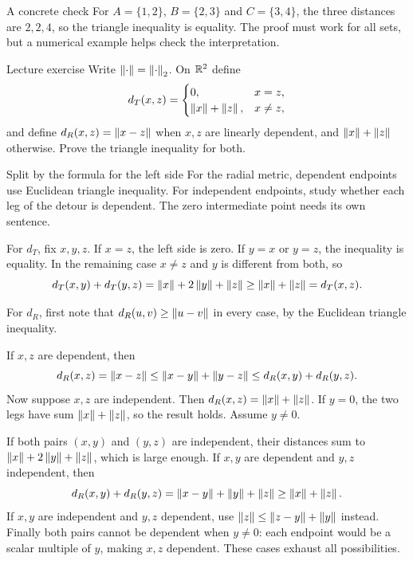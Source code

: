 \begin{note}{A concrete check}
For $A=\{1,2\}$, $B=\{2,3\}$ and $C=\{3,4\}$, the three distances are $2,2,4$, so the triangle inequality is equality. The proof must work for all sets, but a numerical example helps check the interpretation.
\end{note}
\begin{exam}{Lecture exercise}
Write $\left\lVert\cdot\right\rVert=\left\lVert\cdot\right\rVert_2$. On $\mathbb R^2$ define
\[d_T(x,z)=\begin{cases}0,&x=z,\\\left\lVert x\right\rVert+\left\lVert z\right\rVert,&x\ne z,\end{cases}\]
and define $d_R(x,z)=\left\lVert x-z\right\rVert$ when $x,z$ are linearly dependent, and $\left\lVert x\right\rVert+\left\lVert z\right\rVert$ otherwise. Prove the triangle inequality for both.
\end{exam}
\begin{method}{Split by the formula for the left side}
For the radial metric, dependent endpoints use Euclidean triangle inequality. For independent endpoints, study whether each leg of the detour is dependent. The zero intermediate point needs its own sentence.
\end{method}
\begin{answer}
For $d_T$, fix $x,y,z$. If $x=z$, the left side is zero. If $y=x$ or $y=z$, the inequality is equality. In the remaining case $x\ne z$ and $y$ is different from both, so
\[d_T(x,y)+d_T(y,z)=\left\lVert x\right\rVert+2\left\lVert y\right\rVert+\left\lVert z\right\rVert\ge\left\lVert x\right\rVert+\left\lVert z\right\rVert=d_T(x,z).\]

For $d_R$, first note that $d_R(u,v)\ge\left\lVert u-v\right\rVert$ in every case, by the Euclidean triangle inequality.

If $x,z$ are dependent, then
\[d_R(x,z)=\left\lVert x-z\right\rVert\le\left\lVert x-y\right\rVert+\left\lVert y-z\right\rVert\le d_R(x,y)+d_R(y,z).\]
Now suppose $x,z$ are independent. Then $d_R(x,z)=\left\lVert x\right\rVert+\left\lVert z\right\rVert$. If $y=0$, the two legs have sum $\left\lVert x\right\rVert+\left\lVert z\right\rVert$, so the result holds. Assume $y\ne0$.

If both pairs $(x,y)$ and $(y,z)$ are independent, their distances sum to $\left\lVert x\right\rVert+2\left\lVert y\right\rVert+\left\lVert z\right\rVert$, which is large enough. If $x,y$ are dependent and $y,z$ independent, then
\[d_R(x,y)+d_R(y,z)=\left\lVert x-y\right\rVert+\left\lVert y\right\rVert+\left\lVert z\right\rVert\ge\left\lVert x\right\rVert+\left\lVert z\right\rVert.\]
If $x,y$ are independent and $y,z$ dependent, use $\left\lVert z\right\rVert\le\left\lVert z-y\right\rVert+\left\lVert y\right\rVert$ instead. Finally both pairs cannot be dependent when $y\ne0$: each endpoint would be a scalar multiple of $y$, making $x,z$ dependent. These cases exhaust all possibilities.
\end{answer}
